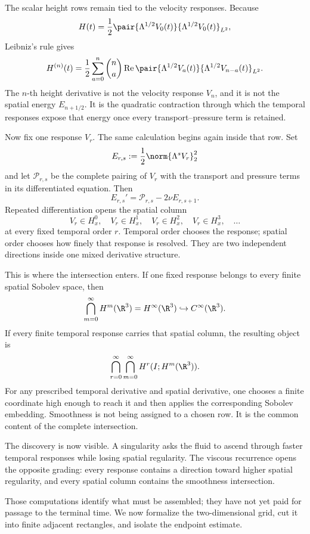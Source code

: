 The scalar height rows remain tied to the velocity responses.  Because
\[
  H(t)=\frac12
  \pair{\Lambda^{1/2}V_0(t)}
       {\Lambda^{1/2}V_0(t)}_{L^2},
\]
Leibniz's rule gives
\begin{equation}\label{eq:BodyHeightDerivativeTemporalContraction}
  H^{(n)}(t)
  =\frac12\sum_{a=0}^{n}\binom{n}{a}
  \operatorname{Re}
  \pair{\Lambda^{1/2}V_a(t)}
       {\Lambda^{1/2}V_{n-a}(t)}_{L^2}.
\end{equation}
The \(n\)-th height derivative is not the velocity response \(V_n\), and it
is not the spatial energy \(E_{n+1/2}\).  It is the quadratic contraction
through which the temporal responses expose that energy once every
transport--pressure term is retained.

Now fix one response \(V_r\).  The same calculation begins again inside that
row.  Set
\[
  E_{r,s}:=\frac12\norm{\Lambda^sV_r}_2^2
\]
and let \(\mathcal P_{r,s}\) be the complete pairing of \(V_r\) with the
transport and pressure terms in its differentiated equation.  Then
\begin{equation}\label{eq:BodyEveryResponseDiscovery}
  E_{r,s}'=\mathcal P_{r,s}-2\nu E_{r,s+1}.
\end{equation}
Repeated differentiation opens the spatial column
\[
  V_r\in H_x^0,
  \quad V_r\in H_x^1,
  \quad V_r\in H_x^2,
  \quad V_r\in H_x^3,
  \quad\ldots
\]
at every fixed temporal order \(r\).  Temporal order chooses the response;
spatial order chooses how finely that response is resolved.  They are two
independent directions inside one mixed derivative structure.

This is where the intersection enters.  If one fixed response belongs to
every finite spatial Sobolev space, then
\[
  \bigcap_{m=0}^{\infty}H^m(\R^3)
  =H^\infty(\R^3)
  \hookrightarrow C^\infty(\R^3).
\]
If every finite temporal response carries that spatial column, the resulting
object is
\begin{equation}\label{eq:BodyDesiredMixedIntersection}
  \bigcap_{r=0}^{\infty}
  \bigcap_{m=0}^{\infty}
  H^r(I;H^m(\R^3)).
\end{equation}
For any prescribed temporal derivative and spatial derivative, one chooses a
finite coordinate high enough to reach it and then applies the corresponding
Sobolev embedding.  Smoothness is not being assigned to a chosen row.  It is
the common content of the complete intersection.

The discovery is now visible.  A singularity asks the fluid to ascend through
faster temporal responses while losing spatial regularity.  The viscous
recurrence opens the opposite grading: every response contains a direction
toward higher spatial regularity, and every spatial column contains the
smoothness intersection.

Those computations identify what must be assembled; they have not yet paid
for passage to the terminal time.  We now formalize the two-dimensional grid,
cut it into finite adjacent rectangles, and isolate the endpoint estimate.
